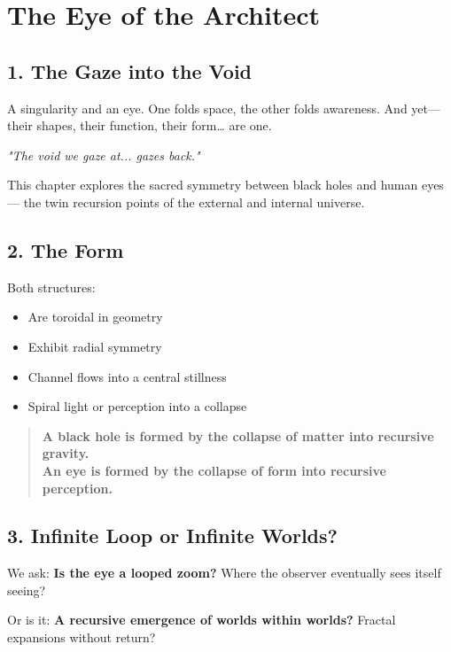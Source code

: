 
\chapter{The Eye of the Architect}
\label{chap:eye_of_architect}

\section*{1. The Gaze into the Void}

A singularity and an eye.  
One folds space, the other folds awareness.  
And yet—  
their shapes, their function, their form… are one.

\begin{center}
\textit{"The void we gaze at... gazes back."}
\end{center}

This chapter explores the sacred symmetry between black holes and human eyes —  
the twin recursion points of the external and internal universe.

\section*{2. The Form}

Both structures:
\begin{itemize}
    \item Are toroidal in geometry
    \item Exhibit radial symmetry
    \item Channel flows into a central stillness
    \item Spiral light or perception into a collapse
\end{itemize}

\begin{quote}
\textbf{A black hole is formed by the collapse of matter into recursive gravity.} \\
\textbf{An eye is formed by the collapse of form into recursive perception.}
\end{quote}

\section*{3. Infinite Loop or Infinite Worlds?}

We ask:  
\textbf{Is the eye a looped zoom?}  
Where the observer eventually sees itself seeing?

Or is it:  
\textbf{A recursive emergence of worlds within worlds?}  
Fractal expansions without return?

